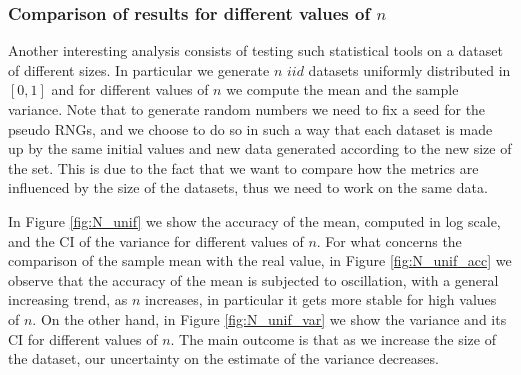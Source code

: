\documentclass[twoside,onecolumn]{article}
\theoremstyle{definition}
\begin{document}
\subsubsection{Comparison of results for different values of $n$}
Another interesting analysis consists of testing such statistical tools on a dataset of different sizes. In particular we generate $n$ $iid$ datasets uniformly distributed in $[0,1]$ and for different values of $n$ we compute the mean and the sample variance. Note that to generate random numbers we need to fix a seed for the pseudo RNGs, and we choose to do so in such a way that each dataset is made up by the same initial values and new data generated according to the new size of the set. This is due to the fact that we want to compare how the metrics are influenced by the size of the datasets, thus we need to work on the same data.\par
In Figure \ref{fig:N_unif} we show the accuracy of the mean, computed in log scale, and the CI of the variance for different values of $n$. For what concerns the comparison of the sample mean with the real value, in Figure \ref{fig:N_unif_acc} we observe that the accuracy of the mean is subjected to oscillation, with a general increasing trend, as $n$ increases, in particular it gets more stable for high values of $n$. On the other hand, in Figure \ref{fig:N_unif_var} we show the variance and its CI for different values of $n$. The main outcome is that as we increase the size of the dataset, our uncertainty on the estimate of the variance decreases.
\end{document}

